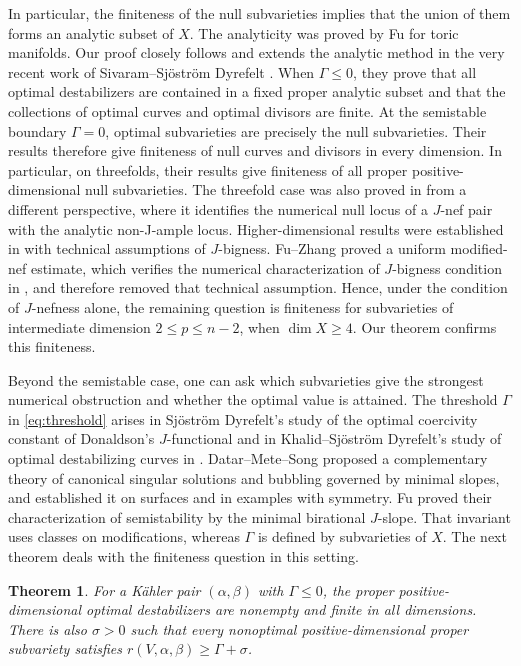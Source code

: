\documentclass[reqno]{amsart}
\theoremstyle{remark}
\theoremstyle{plain}
\newtheorem{theorem}[thm]{Theorem}
\begin{document}
In particular, the finiteness of the null subvarieties implies that the union of them forms an analytic subset of $X$. The analyticity was proved by Fu \cite{F26} for toric manifolds. 
Our proof closely follows and extends the analytic method in the very recent work of Sivaram--Sj\"ostr\"om Dyrefelt \cite[Section 4]{SSD26}.  When \(\Gamma\le0\), they prove that all optimal destabilizers are contained in a fixed proper analytic subset and that the collections of optimal curves and optimal divisors are finite. At the semistable boundary \(\Gamma=0\), optimal subvarieties are precisely the null subvarieties. Their results therefore give finiteness of null curves and divisors in every dimension. 
In particular, on threefolds, their results give finiteness of all proper positive-dimensional null subvarieties. The threefold case was also proved in \cite{L26a} from a different perspective, where it identifies the numerical null locus of a $J$-nef pair with the analytic non-J-ample locus. Higher-dimensional results were established in \cite{L26b} with technical assumptions of $J$-bigness. Fu--Zhang \cite{FZ} proved a uniform modified-nef estimate, which verifies the numerical characterization of \(J\)-bigness condition in \cite[Proposition 2]{L26b}, and therefore removed that technical assumption. Hence, under the condition of $J$-nefness alone, the remaining question is finiteness for subvarieties of intermediate dimension \(2\le p\le n-2\), when $\dim X\geq 4$. Our theorem confirms this finiteness. 

Beyond the semistable case, one can ask which subvarieties give the strongest numerical obstruction and whether the optimal value is attained. The threshold \(\Gamma\) in \eqref{eq:threshold} arises in Sjöström Dyrefelt's study of the optimal coercivity constant of Donaldson's \(J\)-functional \cite{SD20} and in Khalid–Sjöström Dyrefelt’s study of optimal destabilizing curves in \cite{KD24}. Datar--Mete--Song \cite{DMS} proposed a complementary theory of canonical singular solutions and bubbling governed by minimal slopes, and established it on surfaces and in examples with symmetry. Fu \cite{FuMinimal} proved their characterization of semistability by the minimal birational \(J\)-slope. That invariant uses classes on modifications, whereas \(\Gamma\) is defined by subvarieties of \(X\). The next theorem deals with the finiteness question in this setting.


\begin{theorem}\label{thm:optimal-finiteness}
For a K\"ahler pair $(\alpha,\beta)$ with \(\Gamma\le0\), the proper positive-dimensional optimal destabilizers are nonempty and finite in all dimensions. There is also \(\sigma>0\) such that every nonoptimal positive-dimensional proper subvariety satisfies \(r(V,\alpha,\beta)\ge\Gamma+\sigma\).
\end{theorem}
\end{document}
